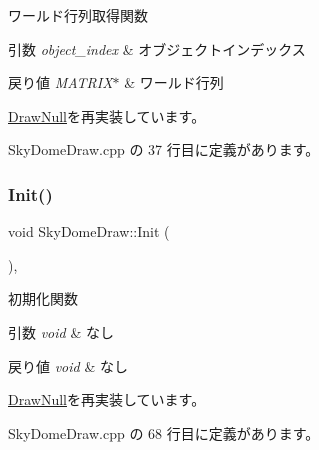 ワールド行列取得関数 


\begin{DoxyParams}{引数}
{\em object\+\_\+index} & オブジェクトインデックス \\
\hline
\end{DoxyParams}

\begin{DoxyRetVals}{戻り値}
{\em M\+A\+T\+R\+I\+X$\ast$} & ワールド行列 \\
\hline
\end{DoxyRetVals}


\mbox{\hyperlink{class_draw_null_a9aac059eb3b5d1f77e8bd3aa0647cff9}{Draw\+Null}}を再実装しています。



 Sky\+Dome\+Draw.\+cpp の 37 行目に定義があります。

\mbox{\label{class_sky_dome_draw_a5b82e8b650a20dbc0b7ed720d1fb7fab}} 
\subsubsection{\texorpdfstring{Init()}{Init()}}
{\footnotesize\ttfamily void Sky\+Dome\+Draw\+::\+Init (\begin{DoxyParamCaption}{ }\end{DoxyParamCaption})\hspace{0.3cm}{\ttfamily [override]}, {\ttfamily [virtual]}}



初期化関数 


\begin{DoxyParams}{引数}
{\em void} & なし \\
\hline
\end{DoxyParams}

\begin{DoxyRetVals}{戻り値}
{\em void} & なし \\
\hline
\end{DoxyRetVals}


\mbox{\hyperlink{class_draw_null_a20aef1e54c1a158b741bfd731e18efdf}{Draw\+Null}}を再実装しています。



 Sky\+Dome\+Draw.\+cpp の 68 行目に定義があります。

\mbox{\label{class_sky_dome_draw_aee1c6b102a97033073b2559b8c2c328b}} 
